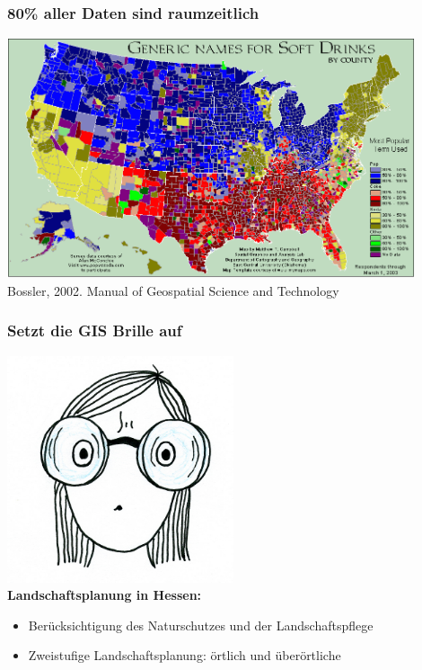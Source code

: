 \documentclass{beamer}
\begin{document}
\begin{frame}
\frametitle{80\% aller Daten sind raumzeitlich}
\centering
\includegraphics[width=0.9\textwidth]{Figures/softdrinks.png}\\
Bossler, 2002. Manual of Geospatial Science and Technology
\end{frame}


\begin{frame}
\frametitle{Setzt die GIS Brille auf}
\centering
\includegraphics[width=0.5\textwidth]{Figures/GIglass.png}\\
\pause
\textbf{Landschaftsplanung in Hessen:}\footnotesize
\begin{itemize}
\item Berücksichtigung des Naturschutzes und der Landschaftspflege
\item Zweistufige Landschaftsplanung: örtlich und überörtliche
\end{itemize}
\end{frame}

\end{document}

